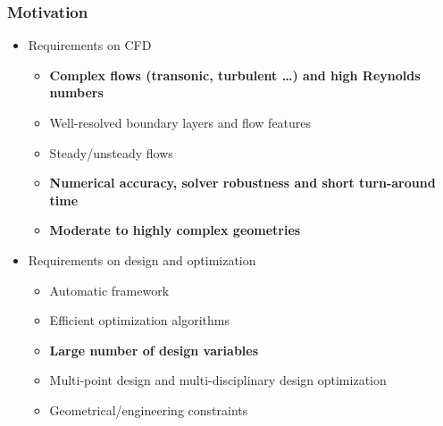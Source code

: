 



\begin{frame}
  \frametitle{Motivation}
  \begin{itemize}
    \item Requirements on CFD
      \begin{itemize}
      \item \textbf<2>{Complex flows (transonic, turbulent \dots) and high Reynolds numbers}
      \item Well-resolved boundary layers and flow features
      \item Steady/unsteady flows
      \item \textbf<3>{Numerical accuracy, solver robustness and short turn-around time}
      \item \textbf<2>{Moderate to highly complex geometries}
      \end{itemize}
    \item Requirements on design and optimization 
      \begin{itemize}
      \item Automatic framework
      \item Efficient optimization algorithms
      \item \textbf<3>{Large number of design variables}
      \item Multi-point design and multi-disciplinary design optimization
      \item Geometrical/engineering constraints 
      \end{itemize}
   \end{itemize}
   \\
\end{frame}


